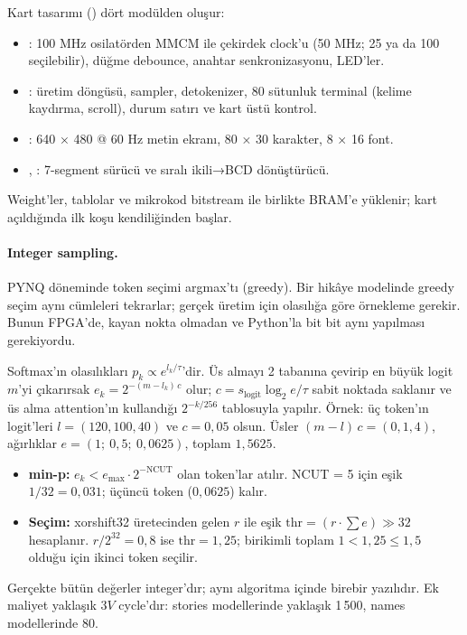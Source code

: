 \neyapildi
Kart tasarımı () dört modülden oluşur:
\begin{itemize}
  \item {}: 100 MHz osilatörden MMCM ile çekirdek clock'u (50 MHz; 25 ya da 100 seçilebilir), düğme debounce, anahtar senkronizasyonu, LED'ler.
  \item {}: üretim döngüsü, sampler, detokenizer, 80 sütunluk terminal (kelime kaydırma, scroll), durum satırı ve kart üstü kontrol.
  \item {}: 640 × 480 @ 60 Hz metin ekranı, 80 × 30 karakter, 8 × 16 font.
  \item {}, : 7-segment sürücü ve sıralı ikili→BCD dönüştürücü.
\end{itemize}
Weight'ler, tablolar ve mikrokod bitstream ile birlikte BRAM'e yüklenir; kart açıldığında ilk koşu kendiliğinden başlar.

\paragraph{Integer sampling.} PYNQ döneminde token seçimi argmax'tı (greedy). Bir hikâye modelinde greedy seçim aynı cümleleri tekrarlar; gerçek üretim için olasılığa göre örnekleme gerekir. Bunun FPGA'de, kayan nokta olmadan ve Python'la bit bit aynı yapılması gerekiyordu.

\begin{ozet}
Softmax'ın olasılıkları $p_k \propto e^{l_k/\tau}$'dir. Üs almayı 2 tabanına çevirip en büyük logit $m$'yi çıkarırsak $e_k = 2^{-(m-l_k)\,c}$ olur; $c = s_\text{logit}\log_2 e/\tau$ sabit noktada saklanır ve üs alma attention'ın kullandığı $2^{-k/256}$ tablosuyla yapılır. Örnek: üç token'ın logit'leri $l = (120, 100, 40)$ ve $c = 0{,}05$ olsun. Üsler $(m-l)\,c = (0, 1, 4)$, ağırlıklar $e = (1;\ 0{,}5;\ 0{,}0625)$, toplam $1{,}5625$.
\begin{itemize}
  \item \textbf{min-p:} $e_k < e_\text{max}\cdot 2^{-\text{NCUT}}$ olan token'lar atılır. NCUT = 5 için eşik $1/32 = 0{,}031$; üçüncü token ($0{,}0625$) kalır.
  \item \textbf{Seçim:} xorshift32 üretecinden gelen $r$ ile eşik $\text{thr} = (r\cdot\sum e)\gg 32$ hesaplanır. $r/2^{32} = 0{,}8$ ise $\text{thr} = 1{,}25$; birikimli toplam $1 < 1{,}25 \le 1{,}5$ olduğu için ikinci token seçilir.
\end{itemize}
Gerçekte bütün değerler integer'dır; aynı algoritma  içinde birebir yazılıdır. Ek maliyet yaklaşık $3V$ cycle'dır: stories modellerinde yaklaşık 1\,500, names modellerinde 80.
\end{ozet}

